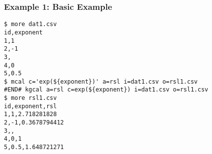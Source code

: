 \subsubsection*{Example 1: Basic Example}



\begin{Verbatim}[baselinestretch=0.7,frame=single]
$ more dat1.csv
id,exponent
1,1
2,-1
3,
4,0
5,0.5
$ mcal c='exp(${exponent})' a=rsl i=dat1.csv o=rsl1.csv
#END# kgcal a=rsl c=exp(${exponent}) i=dat1.csv o=rsl1.csv
$ more rsl1.csv
id,exponent,rsl
1,1,2.718281828
2,-1,0.3678794412
3,,
4,0,1
5,0.5,1.648721271
\end{Verbatim}
